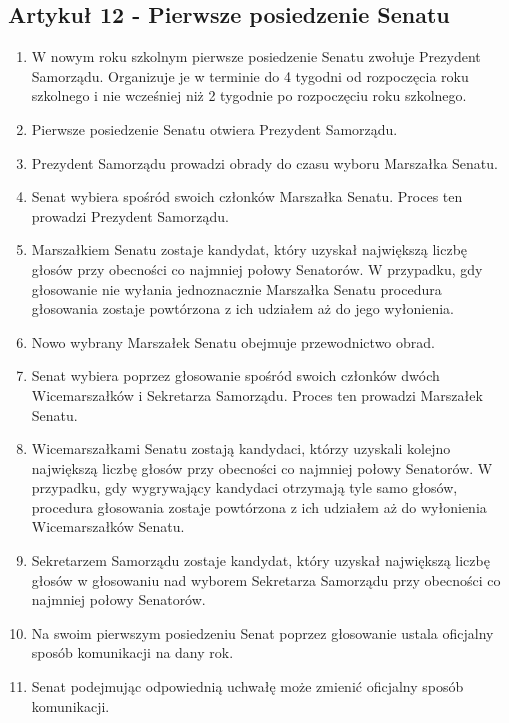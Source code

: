 \documentclass[14pt]{article}
\newenvironment{ustepy}{%
	\begin{enumerate}[leftmargin=1.5em, itemindent=1pt, labelwidth=1em, itemsep=5pt]
	}{%
	\end{enumerate}
}
\begin{document}
\subsection*{Artykuł 12 - Pierwsze posiedzenie Senatu}
\begin{ustepy}
	\item W nowym roku szkolnym pierwsze posiedzenie Senatu zwołuje Prezydent Samorządu. Organizuje je w terminie do 4 tygodni od rozpoczęcia roku szkolnego i nie wcześniej niż 2 tygodnie po rozpoczęciu roku szkolnego.
	\item Pierwsze posiedzenie Senatu otwiera Prezydent Samorządu.
	\item Prezydent Samorządu prowadzi obrady do czasu wyboru Marszałka Senatu.
	\item Senat wybiera spośród swoich członków Marszałka Senatu. Proces ten prowadzi Prezydent Samorządu.
	\item Marszałkiem Senatu zostaje kandydat, który uzyskał największą liczbę głosów przy obecności co najmniej połowy Senatorów. W przypadku, gdy głosowanie nie wyłania jednoznacznie Marszałka Senatu procedura głosowania zostaje powtórzona z ich udziałem aż do jego wyłonienia.
	\item Nowo wybrany Marszałek Senatu obejmuje przewodnictwo obrad.
	\item Senat wybiera poprzez głosowanie spośród swoich członków dwóch Wicemarszałków i Sekretarza Samorządu. Proces ten prowadzi Marszałek Senatu.
	\item Wicemarszałkami Senatu zostają kandydaci, którzy uzyskali kolejno największą liczbę głosów  przy obecności co najmniej połowy Senatorów. W przypadku, gdy wygrywający kandydaci otrzymają tyle samo głosów, procedura głosowania zostaje powtórzona z ich udziałem aż do wyłonienia Wicemarszałków Senatu. 
	\item Sekretarzem Samorządu zostaje kandydat, który uzyskał największą liczbę głosów w głosowaniu nad wyborem Sekretarza Samorządu przy obecności co najmniej połowy Senatorów.
	\item Na swoim pierwszym posiedzeniu Senat poprzez głosowanie ustala oficjalny sposób komunikacji na dany rok. 
	\item Senat podejmując odpowiednią uchwałę może zmienić oficjalny sposób komunikacji.
\end{ustepy}
\end{document}
